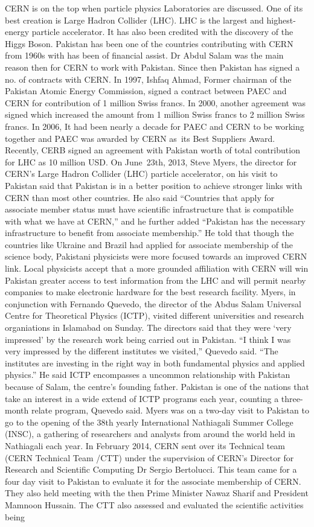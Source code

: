 \documentclass[]{article}
\begin{document}
CERN is on the top when particle physics Laboratories are discussed. One of its best creation is Large Hadron Collider (LHC). LHC is the largest and highest-energy particle accelerator. It has also been credited with the discovery of the Higgs Boson. Pakistan has been one of the countries contributing with CERN from 1960s with has been of financial assist. Dr Abdul Salam was the main reason then for CERN to work with Pakistan. Since then Pakistan has signed a no. of contracts with CERN. In 1997, Ishfaq Ahmad, Former chairman of the Pakistan Atomic Energy Commission, signed a contract between PAEC and CERN for contribution of 1 million Swiss francs. In 2000, another agreement was signed which increased the amount from 1 million Swiss francs to 2 million Swiss francs. In 2006, It had been nearly a decade for PAEC and CERN to be working together and PAEC was awarded by CERN as its Best Suppliers Award. Recently, CERB signed an agreement with Pakistan worth of total contribution for LHC as 10 million USD. On June 23th, 2013, Steve Myers, the director for CERN’s Large Hadron Collider (LHC) particle accelerator, on his visit to Pakistan said that Pakistan is in a better position to achieve stronger links with CERN than most other countries. He also said “Countries that apply for associate member status must have scientific infrastructure that is compatible with what we have at CERN,” and he further added “Pakistan has the necessary infrastructure to benefit from associate membership.” He told that though the countries like Ukraine and Brazil had applied for associate membership of the science body, Pakistani physicists were more focused towards an improved CERN link. Local physicists accept that a more grounded affiliation with CERN will win Pakistan greater access to test information from the LHC and will permit nearby companies to make electronic hardware for the best research facility. Myers, in conjunction with Fernando Quevedo, the director of the Abdus Salam Universal Centre for Theoretical Physics (ICTP), visited different universities and research organiations in Islamabad on Sunday. The directors said that they were ‘very impressed’ by the research work being carried out in Pakistan. “I think I was very impressed by the different institutes we visited,” Quevedo said. “The institutes are investing in the right way in both fundamental physics and applied physics.” He said ICTP encompasses a uncommon relationship with Pakistan because of Salam, the centre’s founding father. Pakistan is one of the nations that take an interest in a wide extend of ICTP programs each year, counting a three-month relate program, Quevedo said. Myers was on a two-day visit to Pakistan to go to the opening of the 38th yearly International Nathiagali Summer College (INSC), a gathering of researchers and analysts from around the world held in Nathiagali each year. In February 2014, CERN sent over its Technical team (CERN Technical Team /CTT) under the supervision of CERN’s Director for Research and Scientific Computing Dr Sergio Bertolucci. This team came for a four day visit to Pakistan to evaluate it for the associate membership of CERN. They also held meeting with the then Prime Minister Nawaz Sharif and President Mamnoon Hussain. The CTT also assessed and evaluated the scientific activities being 
\end{document}
